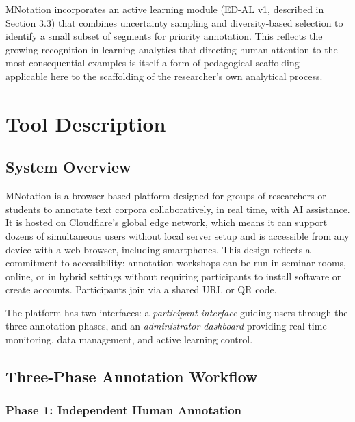 \documentclass[fleqn,10pt]{JLA_article}
\begin{document}
MNotation incorporates an active learning module (ED-AL v1, described in Section 3.3)
that combines uncertainty sampling and diversity-based selection to identify a small
subset of segments for priority annotation. This reflects the growing recognition in
learning analytics that directing human attention to the most consequential examples is
itself a form of pedagogical scaffolding \cite{munshi2023analysing} — applicable here to
the scaffolding of the researcher's own analytical process.

\section{Tool Description}

\subsection{System Overview}

MNotation is a browser-based platform designed for groups of researchers or students to
annotate text corpora collaboratively, in real time, with AI assistance. It is hosted on
Cloudflare's global edge network, which means it can support dozens of simultaneous users
without local server setup and is accessible from any device with a web browser, including
smartphones. This design reflects a commitment to accessibility: annotation workshops can
be run in seminar rooms, online, or in hybrid settings without requiring participants to
install software or create accounts. Participants join via a shared URL or QR code.

The platform has two interfaces: a \emph{participant interface} guiding users through the
three annotation phases, and an \emph{administrator dashboard} providing real-time
monitoring, data management, and active learning control.

\subsection{Three-Phase Annotation Workflow}

\subsubsection{Phase 1: Independent Human Annotation}
\end{document}
